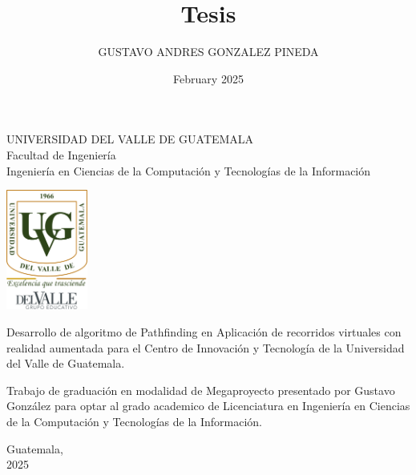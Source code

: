 \documentclass{article}
\title{Tesis}
\author{GUSTAVO ANDRES GONZALEZ PINEDA}
\date{February 2025}
\begin{document}
\begin{center}
\begin{doublespace}
    \thispagestyle{empty}  %
    \Large{UNIVERSIDAD DEL VALLE DE GUATEMALA}\\
    Facultad de Ingeniería \\
    Ingeniería en Ciencias de la Computación y Tecnologías de la Información 

    \vspace{15mm} 
    \includegraphics[width=0.2\textwidth]{images/Uvg_logo.jpg}

    \vspace{15mm} 
    {\Large Desarrollo de algoritmo de Pathfinding en Aplicación de recorridos virtuales con realidad aumentada para el Centro de Innovación y Tecnología de la Universidad del Valle de Guatemala.}

    \vspace{10mm} 
    {\Large Trabajo de graduación en modalidad de Megaproyecto presentado por Gustavo González
    para optar al grado academico de Licenciatura en Ingeniería en Ciencias de la Computación y Tecnologías de la Información.}

    {\Large Guatemala, \\ 2025}
    
\end{doublespace}
\end{center}

\newpage %

\thispagestyle{empty} %
\mbox{} %
\newpage %
\end{document}

